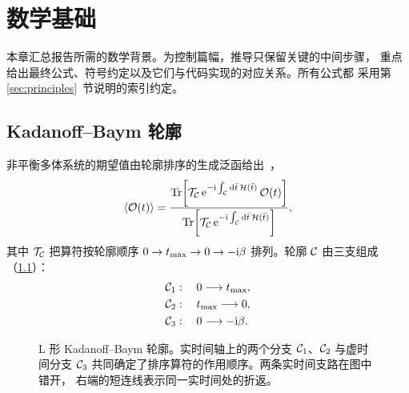 \chapter{数学基础}
\label{ch:math}

本章汇总报告所需的数学背景。为控制篇幅，推导只保留关键的中间步骤，
重点给出最终公式、符号约定以及它们与代码实现的对应关系。所有公式都
采用第\ref{sec:principles}~节说明的索引约定。

\section{Kadanoff--Baym 轮廓}
\label{sec:contour}

非平衡多体系统的期望值由轮廓排序的生成泛函给出~\cite{stefanucci2013}，
\begin{equation}
    \langle \mathcal{O}(t) \rangle
    =
    \frac{\operatorname{Tr}\!\left[
        \mathcal{T}_{\mathcal{C}}\,
        \mathrm{e}^{-\mathrm{i}\int_{\mathcal{C}}\mathrm{d}\bar{t}\,\mathcal{H}(\bar{t})}\,
        \mathcal{O}(t)\right]}
    {\operatorname{Tr}\!\left[
        \mathcal{T}_{\mathcal{C}}\,
        \mathrm{e}^{-\mathrm{i}\int_{\mathcal{C}}\mathrm{d}\bar{t}\,\mathcal{H}(\bar{t})}\right]},
    \label{eq:expectation}
\end{equation}
其中 $\mathcal{T}_{\mathcal{C}}$ 把算符按轮廓顺序
$0\to t_{\max}\to 0\to -\mathrm{i}\beta$ 排列。轮廓 $\mathcal{C}$ 由三支组成
（\cref{fig:contour}）：
\begin{align}
    \mathcal{C}_1 &: \quad 0 \longrightarrow t_{\max}, \\
    \mathcal{C}_2 &: \quad t_{\max} \longrightarrow 0, \\
    \mathcal{C}_3 &: \quad 0 \longrightarrow -\mathrm{i}\beta .
\end{align}

\begin{figure}[htbp]
    \centering
    \caption[L 形 Kadanoff--Baym 轮廓]{L 形 Kadanoff--Baym 轮廓。实时间轴上的两个分支
             $\mathcal{C}_1$、$\mathcal{C}_2$ 与虚时间分支 $\mathcal{C}_3$
             共同确定了排序算符的作用顺序。两条实时间支路在图中错开，
             右端的短连线表示同一实时间处的折返。}
    \label{fig:contour}
\end{figure}

